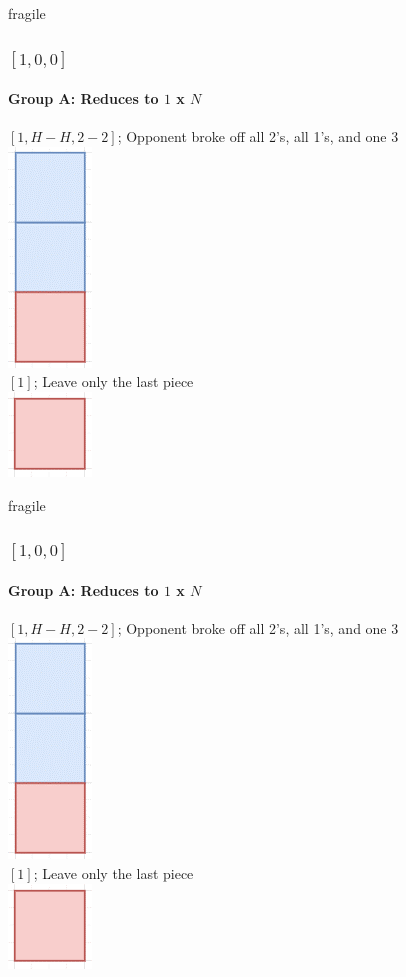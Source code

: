 \documentclass[aspectratio=169,usenames,dvipsnames]{beamer}
\begin{document}
\begin{frame}{fragile}
    \frametitle{$[1, 0, 0]$}
    \framesubtitle{Group A: Reduces to $1$ x $N$}
    
    \begin{multicols}{2}
    $[1, H - H, 2 - 2]$; Opponent broke off all 2’s, all 1’s, and one 3\\
    \includegraphics[scale=.4]{images/[1, 0, 0].png}\\
    $[1]$; Leave only the last piece\\
    \includegraphics[scale=.4]{images/[1].png}
    \end{multicols}
\end{frame}

\begin{frame}{fragile}
    \frametitle{$[1, 0, 0]$}
    \framesubtitle{Group A: Reduces to $1$ x $N$}
    
    \begin{multicols}{2}
    $[1, H - H, 2 - 2]$; Opponent broke off all 2’s, all 1’s, and one 3\\
    \includegraphics[scale=.4]{images/[1, 0, 0].png}\\
    $[1]$; Leave only the last piece\\
    \includegraphics[scale=.4]{images/[1].png}
    \end{multicols}
\end{frame}
\end{document}
